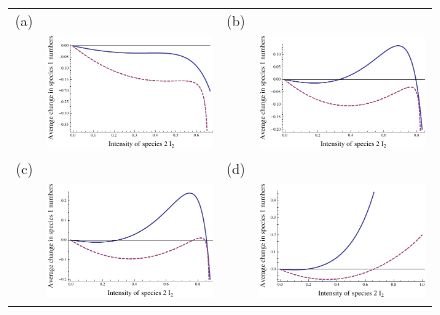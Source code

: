 \begin{figure}[htbp]
\begin{tabular}{rrrr}
(a)&&(b)&\\
&\includegraphics[width=2in]{highy.pdf}&&\includegraphics[width=2in]{lbworkubnot.pdf} \\
(c)&&(d)&\\
&\includegraphics[width=2in]{fourbits.pdf}&&\includegraphics[width=2in]{onerooteach.pdf} \\
\end{tabular}

\end{figure}
